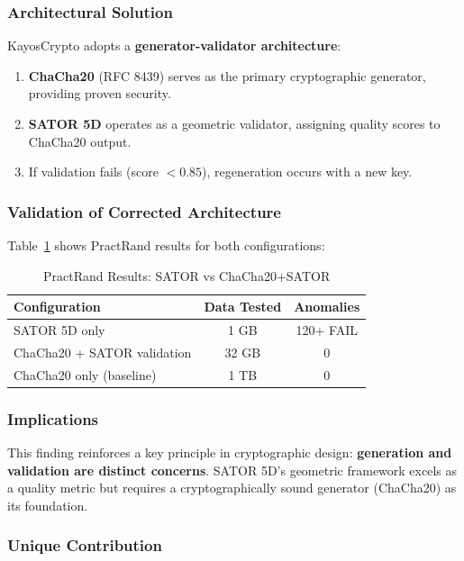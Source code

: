 \subsubsection{Architectural Solution}

KayosCrypto adopts a \textbf{generator-validator architecture}:

\begin{enumerate}
    \item \textbf{ChaCha20} (RFC 8439) serves as the primary cryptographic generator, providing proven security.
    \item \textbf{SATOR 5D} operates as a geometric validator, assigning quality scores to ChaCha20 output.
    \item If validation fails (score $< 0.85$), regeneration occurs with a new key.
\end{enumerate}

\subsubsection{Validation of Corrected Architecture}

Table~\ref{tab:practrand_comparison} shows PractRand results for both configurations:

\begin{table}[h]
\centering
\caption{PractRand Results: SATOR vs ChaCha20+SATOR}
\label{tab:practrand_comparison}
\begin{tabular}{lcc}
\toprule
Configuration & Data Tested & Anomalies \\
\midrule
SATOR 5D only & 1 GB & 120+ FAIL \\
ChaCha20 + SATOR validation & 32 GB & 0 \\
\midrule
ChaCha20 only (baseline) & 1 TB & 0 \\
\bottomrule
\end{tabular}
\end{table}

\subsubsection{Implications}

This finding reinforces a key principle in cryptographic design: \textbf{generation and validation are distinct concerns}. SATOR 5D's geometric framework excels as a quality metric but requires a cryptographically sound generator (ChaCha20) as its foundation.

\subsubsection{Unique Contribution}

